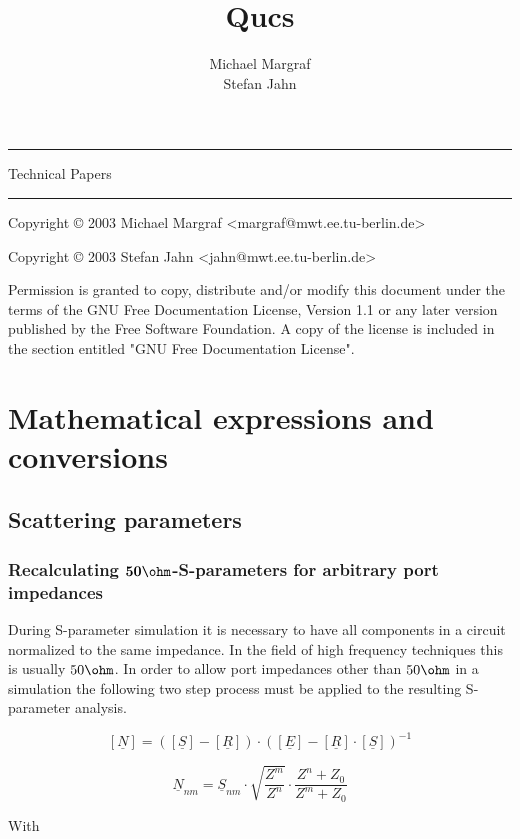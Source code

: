 \documentclass[10pt]{report}
\author{Michael Margraf \\ Stefan Jahn}
\title{Qucs}
\date{}
\makeatletter
\renewcommand{\maketitle}{\begin{titlepage}%
    \let\footnotesize\small
    \let\footnoterule\relax
    \parindent \z@
    \reset@font
    \null\vfil
    \vspace*{3cm}
    \begin{flushleft}
      \bf \huge \@title
    \end{flushleft}
    \par
    \hrule height 3pt
    \par
    \begin{flushright}
      \LARGE Technical Papers \par
    \end{flushright}
    \vskip 60\p@
    \vfill


    \begin{flushright}
      \Large \@author \par
    \end{flushright}

    \hrule height 3pt \par

\vspace*{24pt}

Copyright \copyright{} 2003 Michael Margraf 
\textless margraf@mwt.ee.tu-berlin.de\textgreater \par
Copyright \copyright{} 2003 Stefan Jahn 
\textless jahn@mwt.ee.tu-berlin.de\textgreater \par

\vspace*{12pt}

Permission is granted to copy, distribute and/or modify this document
under the terms of the GNU Free Documentation License, Version 1.1 or
any later version published by the Free Software Foundation.  A copy
of the license is included in the section entitled "GNU Free
Documentation License".

\vspace*{1cm}

  \end{titlepage}%
  \setcounter{footnote}{0}%
}
\makeatother
\begin{document}
\maketitle

\tableofcontents

\setlength{\parindent}{0pt}
\newpage

\chapter*{Mathematical expressions and conversions}

\section*{Scattering parameters}

\subsection*{Recalculating $\mathbf{50\ohm}$-S-parameters for arbitrary port impedances}

During S-parameter simulation it is necessary to have all components
in a circuit normalized to the same impedance.  In the field of high
frequency techniques this is usually $50\ohm$.  In order to allow port
impedances other than $50\ohm$ in a simulation the following two step
process must be applied to the resulting S-parameter analysis.

\begin{equation}
\left[\underline{N}\right] = 
\left(\left[\underline{S}\right] - \left[\underline{R}\right]\right) \cdot
\left(\left[\underline{E}\right] - \left[\underline{R}\right] \cdot \left[\underline{S}\right]\right)^{-1}
\end{equation}

\begin{equation}
\underline{N}_{nm} = \underline{S}_{nm}\cdot \sqrt{\dfrac{Z^{m}}{Z^{n}}}\cdot
\dfrac{Z^{n} + Z_{0}}{Z^{m} + Z_{0}}
\end{equation}

With\\
\end{document}

